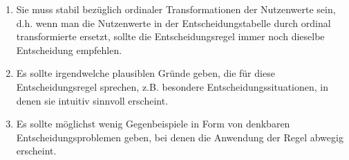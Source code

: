 \begin{enumerate}
  \item Sie muss stabil bezüglich ordinaler Transformationen der Nutzenwerte
  sein, d.h. wenn man die Nutzenwerte in der Entscheidungstabelle durch ordinal
  transformierte ersetzt, sollte die Entscheidungsregel immer noch dieselbe
  Entscheidung empfehlen.
  \item Es sollte irgendwelche plausiblen Gründe geben, die für diese
  Entscheidungsregel sprechen, z.B. besondere Entscheidungssituationen, in
  denen sie intuitiv sinnvoll erscheint.
  \item Es sollte möglichst wenig Gegenbeispiele in Form von denkbaren
  Entscheidungsproblemen geben, bei denen die Anwendung der Regel abwegig
  erscheint.
\end{enumerate}


